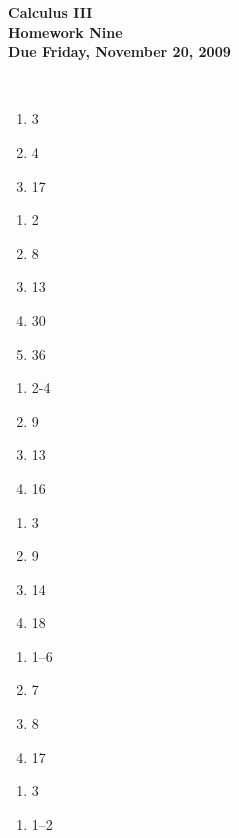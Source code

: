 \documentclass[12pt]{article}
\begin{document}
\pagestyle{empty}
 
\begin{center}
{\large {\bf Calculus III}}\\
\medskip
{\large {\bf Homework Nine}}\\
\medskip
{ {\bf Due Friday, November 20, 2009}}\\
\end{center}

\hspace{2mm}\\




\begin{enumerate}
\setlength{\itemsep}{-1mm}
  \item 3
  \item 4
  \item 17
\end{enumerate}


\begin{enumerate}
\setlength{\itemsep}{-1mm}
  \item 2
  \item 8
  \item 13
  \item 30
  \item 36
\end{enumerate}

\begin{enumerate}
\setlength{\itemsep}{-1mm}
  \item 2-4
  \item 9
  \item 13
  \item 16
\end{enumerate}


\begin{enumerate}
\setlength{\itemsep}{-1mm}
  \item 3
  \item 9
  \item 14
  \item 18
\end{enumerate}


\begin{enumerate}
\setlength{\itemsep}{-1mm}
  \item 1--6
  \item 7
  \item 8
  \item 17
\end{enumerate}


\begin{enumerate}
\setlength{\itemsep}{-1mm}
  \item 3
\end{enumerate}

\begin{enumerate}
\setlength{\itemsep}{-1mm}
  \item 1--2
\end{enumerate}
\end{document}
